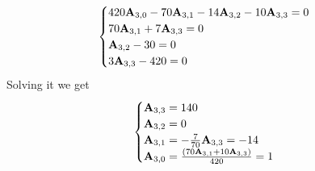 \begin{examp}
    \begin{equation*}
        \begin{cases}
            420 {\mathbf{A}} \sb{3,0} - 70 {\mathbf{A}} \sb{3,1} - 14 {\mathbf{A}} \sb{3,2} - 10 {\mathbf{A}} \sb{3,3} = 0 \\
            70 {\mathbf{A}} \sb{3,1} + 7 {\mathbf{A}} \sb{3,3} = 0 \\
            {\mathbf{A}} \sb{3,2} - 30 = 0 \\
            3 {\mathbf{A}} \sb{3,3} - 420 = 0
        \end{cases}
    \end{equation*}
    Solving it we get
    \begin{equation*}
        \begin{cases}
            {\mathbf{A}} \sb{3,3} = 140 \\
            {\mathbf{A}} \sb{3,2} = 0 \\
            {\mathbf{A}} \sb{3,1} = -\frac{7}{70} {\mathbf{A}} \sb{3,3} = -14 \\
            {\mathbf{A}} \sb{3,0} = \frac{(70 {\mathbf{A}} \sb{3,1} + 10 {\mathbf{A}} \sb{3,3})}{420} = 1
        \end{cases}
    \end{equation*}
\end{examp}